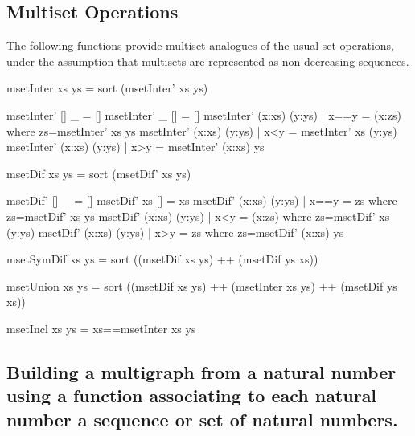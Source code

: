 \documentclass[]{INCLUDES/llncs}
\begin{document}
\subsection*{Multiset Operations}
The following functions provide multiset analogues of the usual set operations,
under the assumption that multisets are represented as non-decreasing sequences.
\begin{code}
msetInter xs ys = sort (msetInter' xs ys)

msetInter' [] _ = []
msetInter' _ [] = []
msetInter' (x:xs) (y:ys) | x==y = 
  (x:zs) where zs=msetInter' xs ys
msetInter' (x:xs) (y:ys) | x<y = msetInter' xs (y:ys)
msetInter' (x:xs) (y:ys) | x>y = msetInter' (x:xs) ys

msetDif xs ys = sort (msetDif' xs ys)

msetDif' [] _ = []
msetDif' xs [] = xs
msetDif' (x:xs) (y:ys) | x==y = zs where 
  zs=msetDif' xs ys
msetDif' (x:xs) (y:ys) | x<y = (x:zs) where 
  zs=msetDif' xs (y:ys)
msetDif' (x:xs) (y:ys) | x>y = zs where 
  zs=msetDif' (x:xs) ys

msetSymDif xs ys = 
  sort ((msetDif xs ys) ++ (msetDif ys xs))

msetUnion xs ys = sort ((msetDif xs ys) ++ 
  (msetInter xs ys) ++ (msetDif ys xs))
  
msetIncl xs ys = xs==msetInter xs ys
 
\end{code}

\subsection*{Building a multigraph from a natural number using a function
associating to each natural number a sequence or set of natural numbers.}
\end{document}
